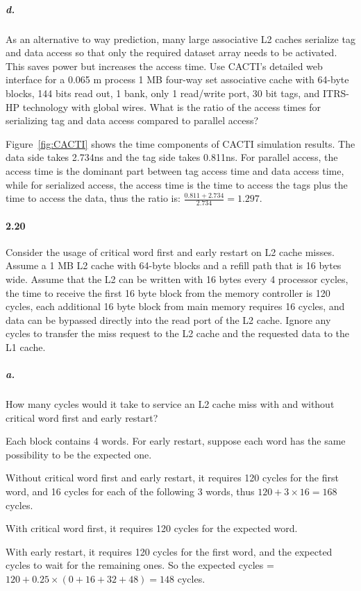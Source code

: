 \documentclass{article}
\begin{document}
\subparagraph{d.} As an alternative to way prediction, many large associative L2 caches serialize tag and data access so that only the required dataset array needs to be activated. This saves power but increases the access time. Use CACTI’s detailed web interface for a 0.065 m process 1 MB four-way set associative cache with 64-byte blocks, 144 bits read out, 1 bank, only 1 read/write port, 30 bit tags, and ITRS-HP technology with global wires. What is the ratio of the access times for serializing tag and data access compared to parallel access?

Figure~\ref{fig:CACTI} shows the time components of CACTI simulation results. The data side takes 2.734ns and the tag side takes 0.811ns. For parallel access, the access time is the dominant part between tag access time and data access time, while for serialized access, the access time is the time to access the tags plus the time to access the data, thus the ratio is: $\frac{0.811+2.734}{2.734}=1.297$.

\paragraph{2.20} Consider the usage of critical word first and early restart on L2 cache misses. Assume a 1 MB L2 cache with 64-byte blocks and a refill path that is 16 bytes wide. Assume that the L2 can be written with 16 bytes every 4 processor cycles, the time to receive the first 16 byte block from the memory controller is 120 cycles, each additional 16 byte block from main memory requires 16 cycles, and data can be bypassed directly into the read port of the L2 cache. Ignore any cycles to transfer the miss request to the L2 cache and the requested data to the L1 cache.

\subparagraph{a.} How many cycles would it take to service an L2 cache miss with and without critical word first and early restart?

Each block contains 4 words. For early restart, suppose each word has the same possibility to be the expected one.

Without critical word first and early restart, it requires 120 cycles for the first word, and 16 cycles for each of the following 3 words, thus $120+3\times16=168$ cycles.

With critical word first, it requires 120 cycles for the expected word.

With early restart, it requires 120 cycles for the first word, and the expected cycles to wait for the remaining ones. So the expected cycles = $120 + 0.25\times(0 + 16 + 32 + 48) = 148$ cycles.
\end{document}
